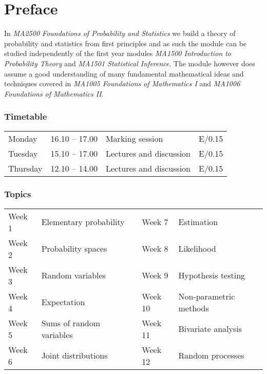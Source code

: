 
\chapter*{Preface}\label{sec:preface}

In \textsl{MA2500 Foundations of Probability and Statistics} we build a theory of probability and statistics from first principles and as such the module can be studied independently of the first year modules \textsl{MA1500 Introduction to Probability Theory} and \textsl{MA1501 Statistical Inference}. The module however does assume a good understanding of many fundamental mathematical ideas and techniques covered in \textsl{MA1005 Foundations of Mathematics I} and \textsl{MA1006 Foundations of Mathematics II}.

\subsection*{Timetable}
\begin{tabular}{llll}
Monday			& 16.10 -- 17.00	& Marking session			& E/0.15 \\
Tuesday			& 15.10 -- 17.00	& Lectures and discussion	& E/0.15 \\ 
Thursday		& 12.10 -- 14.00	& Lectures and discussion	& E/0.15 \\ 
\end{tabular}

\subsection*{Topics}
\begin{tabular}{llcll} 
Week 1		& Elementary probability	&\mbox{}\quad\qquad{} & Week 7		& Estimation \\
Week 2		& Probability spaces 		& & Week 8		& Likelihood \\
Week 3		& Random variables 			& & Week 9		& Hypothesis testing \\
Week 4		& Expectation 				& & Week 10		& Non-parametric methods \\
Week 5		& Sums of random variables 	& & Week 11		& Bivariate analysis \\
Week 6		& Joint distributions 		& & Week 12		& Random processes \\ 
\end{tabular}

